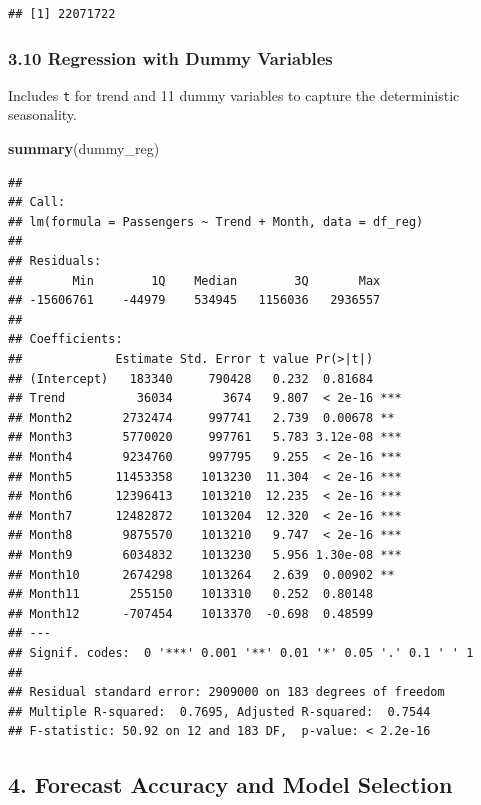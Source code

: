 \documentclass[
]{article}
\newenvironment{Shaded}{\begin{snugshade}}{\end{snugshade}}
\newcommand{\FunctionTok}[1]{\textcolor[rgb]{0.13,0.29,0.53}{\textbf{#1}}}
\newcommand{\NormalTok}[1]{#1}
\begin{document}
\begin{verbatim}
## [1] 22071722
\end{verbatim}

\subsubsection{3.10 Regression with Dummy
Variables}\label{regression-with-dummy-variables}

Includes \texttt{t} for trend and 11 dummy variables to capture the
deterministic seasonality.

\begin{Shaded}
\begin{Highlighting}[]
\FunctionTok{summary}\NormalTok{(dummy\_reg)}
\end{Highlighting}
\end{Shaded}

\begin{verbatim}
## 
## Call:
## lm(formula = Passengers ~ Trend + Month, data = df_reg)
## 
## Residuals:
##       Min        1Q    Median        3Q       Max 
## -15606761    -44979    534945   1156036   2936557 
## 
## Coefficients:
##             Estimate Std. Error t value Pr(>|t|)    
## (Intercept)   183340     790428   0.232  0.81684    
## Trend          36034       3674   9.807  < 2e-16 ***
## Month2       2732474     997741   2.739  0.00678 ** 
## Month3       5770020     997761   5.783 3.12e-08 ***
## Month4       9234760     997795   9.255  < 2e-16 ***
## Month5      11453358    1013230  11.304  < 2e-16 ***
## Month6      12396413    1013210  12.235  < 2e-16 ***
## Month7      12482872    1013204  12.320  < 2e-16 ***
## Month8       9875570    1013210   9.747  < 2e-16 ***
## Month9       6034832    1013230   5.956 1.30e-08 ***
## Month10      2674298    1013264   2.639  0.00902 ** 
## Month11       255150    1013310   0.252  0.80148    
## Month12      -707454    1013370  -0.698  0.48599    
## ---
## Signif. codes:  0 '***' 0.001 '**' 0.01 '*' 0.05 '.' 0.1 ' ' 1
## 
## Residual standard error: 2909000 on 183 degrees of freedom
## Multiple R-squared:  0.7695, Adjusted R-squared:  0.7544 
## F-statistic: 50.92 on 12 and 183 DF,  p-value: < 2.2e-16
\end{verbatim}

\subsection{4. Forecast Accuracy and Model
Selection}\label{forecast-accuracy-and-model-selection}
\end{document}
